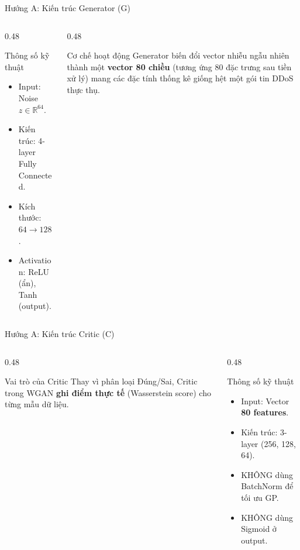 \documentclass[aspectratio=169,11pt]{beamer}
\begin{document}
\begin{frame}{Hướng A: Kiến trúc Generator (G)}
  \begin{columns}[T]
    \begin{column}{0.48\textwidth}
      \begin{exampleblock}{Thông số kỹ thuật}
        \small
        \begin{itemize}
          \item Input: Noise $z \in \mathbb{R}^{64}$.
          \item Kiến trúc: 4-layer Fully Connected.
          \item Kích thước: $64 \to 128 \to 256 \to 256$.
          \item Activation: ReLU (ẩn), Tanh (output).
        \end{itemize}
      \end{exampleblock}
    \end{column}
    \begin{column}{0.48\textwidth}
      \begin{block}{Cơ chế hoạt động}
        \small
        Generator biến đổi vector nhiễu ngẫu nhiên thành một
        \textbf{vector 80 chiều} (tương ứng 80 đặc trưng sau tiền xử lý)
        mang các đặc tính thống kê giống hệt một gói tin DDoS thực thụ.
      \end{block}
    \end{column}
  \end{columns}
\end{frame}

\begin{frame}{Hướng A: Kiến trúc Critic (C)}
  \begin{columns}[T]
    \begin{column}{0.48\textwidth}
      \begin{block}{Vai trò của Critic}
        \small
        Thay vì phân loại Đúng/Sai, Critic trong WGAN \textbf{ghi điểm thực tế}
        (Wasserstein score) cho từng mẫu dữ liệu.
      \end{block}
    \end{column}
    \begin{column}{0.48\textwidth}
      \begin{exampleblock}{Thông số kỹ thuật}
        \small
        \begin{itemize}
          \item Input: Vector \textbf{80 features}.
          \item Kiến trúc: 3-layer (256, 128, 64).
          \item KHÔNG dùng BatchNorm để tối ưu GP.
          \item KHÔNG dùng Sigmoid ở output.
        \end{itemize}
      \end{exampleblock}
    \end{column}
  \end{columns}
\end{frame}
\end{document}
